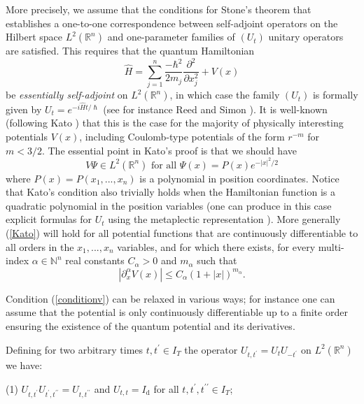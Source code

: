 \documentclass[12pt]{article}%
\begin{document}
More precisely, we assume that the conditions for Stone's theorem that
establishes a one-to-one correspondence between self-adjoint operators on the
Hilbert space $L^{2}(\mathbb{R}^{n})$ and one-parameter families of $(U_{t})$
unitary operators are satisfied. This requires that the quantum Hamiltonian
\begin{equation}
\widehat{H}=\sum_{j=1}^{n}\frac{-\hbar^{2}}{2m_{j}}\frac{\partial^{2}%
}{\partial x_{j}^{2}}+V(x) \label{hamop}%
\end{equation}
be \textit{essentially self-adjoint} on $L^{2}(\mathbb{R}^{n})$, in which case
the family $(U_{t})$ is formally given by $U_{t}=e^{-i\widehat{H}t/\hslash}$
(see for instance Reed and Simon \cite{reedsimon}). It is well-known
(following Kato \cite{Kato}) that this is the case for the majority of
physically interesting potentials $V(x)$, including Coulomb-type potentials of
the form $r^{-m}$ for $m<3/2$. The essential point in Kato's proof is that we
should have
\begin{equation}
V\Psi\in L^{2}(\mathbb{R}^{n})\text{ for all }\Psi(x)=P(x)e^{-|x|^{2}/2}
\label{Kato}%
\end{equation}
where $P(x)=P(x_{1},...,x_{n})$ is a polynomial in position coordinates.
Notice that Kato's condition also trivially holds when the Hamiltonian
function is a quadratic polynomial in the position variables (one can produce
in this case explicit formulas for $U_{t}$ using the metaplectic
representation \cite{ICP,Birk}). More generally (\ref{Kato}) will hold for all
potential functions that are continuously differentiable to all orders in the
$x_{1},...,x_{n}$ variables, and for which there exists, for every multi-index
$\alpha\in\mathbb{N}^{n}$ real constants $C_{\alpha}>0$ and $m_{\alpha}$ such
that%
\begin{equation}
|\partial_{x}^{\alpha}V(x)|\leq C_{\alpha}(1+|x|)^{m_{\alpha}}.
\label{conditionv}%
\end{equation}


Condition (\ref{conditionv}) can be relaxed in various ways; for instance one
can assume that the potential is only continuously differentiable up to a
finite order ensuring the existence of the quantum potential and its derivatives.

Defining for two arbitrary times $t,t^{\prime}\in I_{T}$ the operator
$U_{t,t^{\prime}}=U_{t}U_{-t^{\prime}}$ on $L^{2}(\mathbb{R}^{n})$ we
have:\medskip

(1) $U_{t,t^{\prime}}U_{t^{\prime},t^{\prime\prime}}=U_{t,t^{\prime\prime}}$
and $U_{t,t}=I_{\mathrm{d}}$ for all $t,t^{\prime},t^{\prime\prime}\in I_{T}$;
\end{document}
